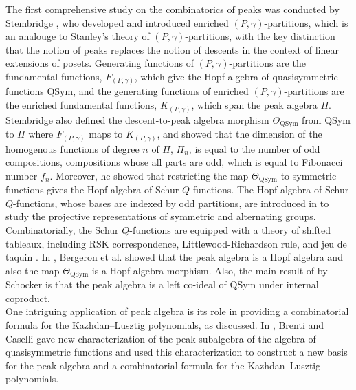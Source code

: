 \documentclass[11pt]{amsart}
\numberwithin{equation}{section}
\newcommand{\QSym}{\mathrm{QSym}}
\begin{document}
The first comprehensive study on the combinatorics of peaks was conducted by Stembridge \cite{S97}, who developed and introduced enriched $(P,\gamma)$-partitions, which is an analouge to Stanley’s theory of $(P,\gamma)$-partitions, with the key distinction that the notion of peaks replaces the notion of descents in the context of linear extensions of posets.
Generating functions of $(P,\gamma)$-partitions are the fundamental functions, $F_{(P,\gamma)}$, which give the Hopf algebra of quasisymmetric functions $\QSym$, and the generating functions of enriched $(P,\gamma)$-partitions are the enriched fundamental functions, $K_{(P,\gamma)}$, which span the peak algebra $\Pi$. Stembridge also defined the descent-to-peak algebra morphism $\Theta_\QSym$ from $\QSym$ to $\Pi$ where  $F_{(P,\gamma)}$ maps to $K_{(P,\gamma)}$, and showed that the dimension of the homogenous functions of degree $n$ of $\Pi$, $\Pi_n$, is equal to the number of odd compositions, compositions whose all parts are odd, which is equal to Fibonacci number $f_n$. 
Moreover, he showed that restricting the map $\Theta_\QSym$ to symmetric functions gives the Hopf algebra of Schur $Q$-functions. The Hopf algebra of Schur $Q$-functions, whose bases are indexed by odd partitions, are introduced in \cite{S11} to study the projective representations of symmetric and alternating groups. Combinatorially, the Schur $Q$-functions are equipped with a theory of shifted tableaux, including RSK correspondence, Littlewood-Richardson rule, and jeu de taquin \cite{S87, S89, W84}. In \cite{BMSvW}, Bergeron et al. showed that the peak algebra is a Hopf algebra and also the map $\Theta_\QSym$ is a Hopf algebra morphism. Also, the main result of \cite{S05} by Schocker is that the peak algebra is a left co-ideal of $\QSym$ under internal coproduct. \\




One intriguing application of peak algebra is its role in providing a combinatorial formula for the Kazhdan–Lusztig polynomials, as discussed.
In \cite{B14}, Brenti and Caselli gave
new characterization of the peak subalgebra of the
algebra of quasisymmetric functions and used this characterization to construct
a new basis for the peak algebra and a combinatorial formula for the Kazhdan–Lusztig polynomials. 
\\
 
\end{document}
